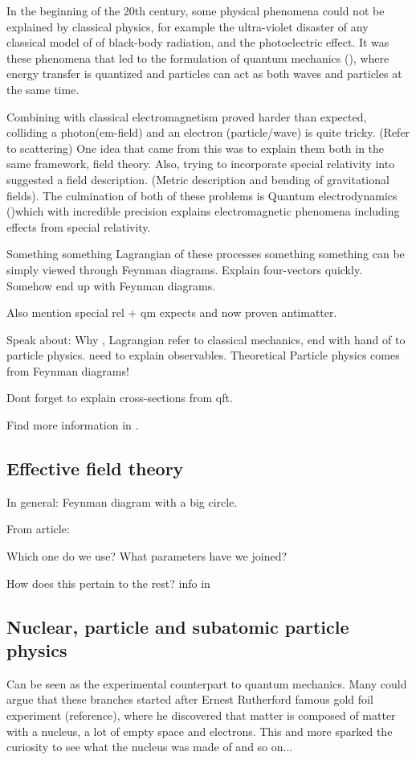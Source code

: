 In the beginning of the 20th century, some physical phenomena could not be explained by classical physics, for example the ultra-violet disaster of any classical model of of black-body radiation, and the photoelectric effect.\citep{Bransden:2000}
It was these phenomena that led to the formulation of quantum mechanics (\abbrQM), where energy transfer is quantized and particles can act as both waves and particles at the same time. 

Combining \abbrQM with classical electromagnetism proved harder than expected, colliding a photon(em-field) and an electron (particle/wave) is quite tricky. (Refer to scattering) One idea that came from this was to explain them both in the same framework, field theory.
Also, trying to incorporate special relativity into \abbrQM suggested a field description. (Metric description and bending of gravitational fields).
The culmination of both of these problems is Quantum electrodynamics (\abbrQED)which with incredible precision explains electromagnetic phenomena including effects from special relativity.\citep{Zee:2003}


Something something Lagrangian of these processes something something can be simply viewed through Feynman diagrams.
Explain four-vectors quickly.
Somehow end up with Feynman diagrams.

Also mention special rel + qm expects and now proven antimatter.

Speak about: Why \abbrQM, Lagrangian refer to classical mechanics, end with hand of to particle physics. need to explain observables.
Theoretical Particle physics comes from Feynman diagrams!

Dont forget to explain cross-sections from qft.

Find more information in \citep{Goldstein:2001,Bransden:2000, Zee:2003}.
\subsection{Effective field theory}
In general:
Feynman diagram with a big circle.

From article:


Which one do we use? What parameters have we joined?


How does this pertain to the rest?
info in \citep{82.116010}
\subsection{Nuclear, particle and subatomic particle physics}
Can be seen as the experimental counterpart to quantum mechanics.
Many could argue that these branches started after Ernest Rutherford famous gold foil experiment (reference), where he discovered that matter is composed of matter with a nucleus, a lot of empty space and electrons. This and more sparked the curiosity to see what the nucleus was made of and so on... 

